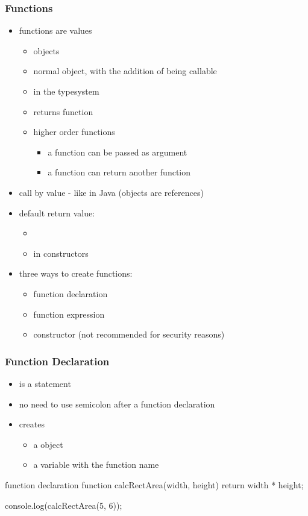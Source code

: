 \begin{frame}[fragile] \frametitle{Functions}

\begin{itemize}
  \item functions are values
  \begin{itemize}
    \item {} objects 
    \item normal object, with the addition of being callable
    \item {} in the typesystem
    \item {} returns {function}
    \item higher order functions
    \begin{itemize}
      \item a function can be passed as argument
      \item a function  can return another function
    \end{itemize}
  \end{itemize}
  \item call by value - like in Java (objects are references)
  \item default return value:
  \begin{itemize}
    \item {}
    \item {} in constructors
  \end{itemize}
  \item three ways to create functions:
  \begin{itemize}
    \item function declaration
    \item function expression
    \item {} constructor (not recommended for security reasons)
  \end{itemize}
\end{itemize}

\end{frame}

\begin{frame}[fragile] \frametitle{Function Declaration}

\begin{itemize}
  \item is a statement
  \item no need to use semicolon after a function declaration
  \item creates
  \begin{itemize}
    \item a  object
    \item a variable with the function name
  \end{itemize}
\end{itemize}
\begin{CodeBox}{function declaration}
function calcRectArea(width, height) {
  return width * height;
}

console.log(calcRectArea(5, 6));
\end{CodeBox}
\end{frame}

